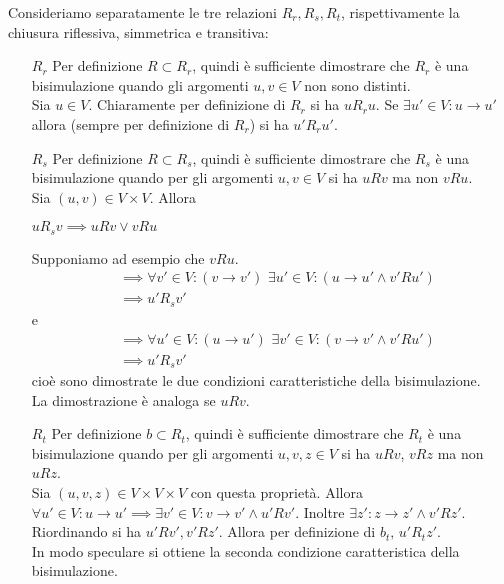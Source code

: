 \begin{proof2}
    Consideriamo separatamente le tre relazioni $R_r, R_s, R_t$, rispettivamente la chiusura riflessiva, simmetrica e transitiva:
    \begin{itemize}
        \item[$R_r$] Per definizione $R \subset R_r$, quindi è sufficiente dimostrare che $R_r$ è una bisimulazione quando gli argomenti $u,v \in V$ non sono distinti.\\
        Sia $u \in V$. Chiaramente per definizione di $R_r$ si ha $u R_r u$. Se $\exists u' \in V: u \to u'$ allora (sempre per definizione di $R_r$) si ha $u' R_r u'$.
        \item[$R_s$] Per definizione $R \subset R_s$, quindi è sufficiente dimostrare che $R_s$ è una bisimulazione quando per gli argomenti $u,v \in V$ si ha $u R v$ ma non $v R u$.\\
        Sia $(u,v) \in V\times V$. Allora
        \begin{center}
            $u R_s v \implies u R v \lor v R u$
        \end{center}
        Supponiamo ad esempio che $v R u$.
        \begin{align*}
            &\implies \forall v' \in V: (v \to v') \,\,\exists u' \in V: (u \to u' \land v' R u')\\
            &\implies u' R_s v'
        \end{align*}
        e
        \begin{align*}
            &\implies \forall u' \in V: (u \to u') \,\,\exists v' \in V: (v \to v' \land v' R u')\\
            &\implies u' R_s v'
        \end{align*}
        cioè sono dimostrate le due condizioni caratteristiche della bisimulazione.\\
        La dimostrazione è analoga se $u R v$.
        \item[$R_t$] Per definizione $b \subset R_t$, quindi è sufficiente dimostrare che $R_t$ è una bisimulazione quando per gli argomenti $u,v,z \in V$ si ha $u R v$, $v R z$ ma non $u R z$.\\
        Sia $(u,v,z) \in V\times V\times V$ con questa proprietà. Allora $\forall u' \in V: u \to u' \implies \exists v' \in V: v \to v' \land u' R v'$. Inoltre $\exists z' : z \to z' \land v' R z'$.\\
        Riordinando si ha $u' R v', v' R z'$. Allora per definizione di $b_t, \, u' R_t z'$.\\
        In modo speculare si ottiene la seconda condizione caratteristica della bisimulazione.
    \end{itemize}
\end{proof2}
